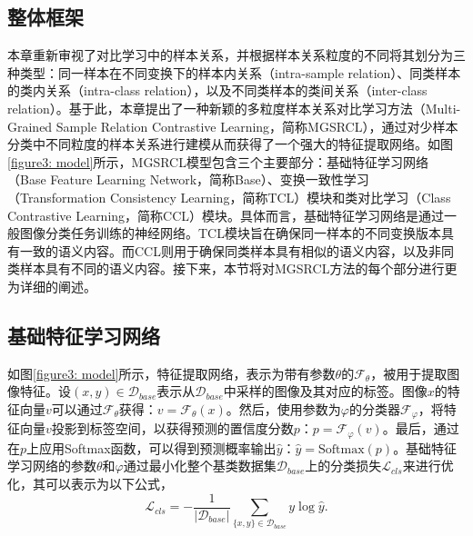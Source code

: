 \subsection[\hspace{-2pt}整体框架]{{\heiti{} \hspace{-8pt}整体框架}}\label{section3: 整体框架}

本章重新审视了对比学习中的样本关系，并根据样本关系粒度的不同将其划分为三种类型：同一样本在不同变换下的样本内关系（intra-sample relation）、同类样本的类内关系（intra-class relation），以及不同类样本的类间关系（inter-class relation）。基于此，本章提出了一种新颖的多粒度样本关系对比学习方法（Multi-Grained Sample Relation Contrastive Learning，简称MGSRCL），通过对少样本分类中不同粒度的样本关系进行建模从而获得了一个强大的特征提取网络。如图\ref{figure3: model}所示，MGSRCL模型包含三个主要部分：基础特征学习网络（Base Feature Learning Network，简称Base）、变换一致性学习（Transformation Consistency Learning，简称TCL）模块和类对比学习（Class Contrastive Learning，简称CCL）模块。具体而言，基础特征学习网络是通过一般图像分类任务训练的神经网络。TCL模块旨在确保同一样本的不同变换版本具有一致的语义内容。而CCL则用于确保同类样本具有相似的语义内容，以及非同类样本具有不同的语义内容。接下来，本节将对MGSRCL方法的每个部分进行更为详细的阐述。

\subsection[\hspace{-2pt}基础特征学习网络]{{\heiti{} \hspace{-8pt}基础特征学习网络}}\label{section3: 基础特征学习网络}

如图\ref{figure3: model}所示，特征提取网络，表示为带有参数$\theta$的$\mathcal{F}_{\theta}$，被用于提取图像特征。设$(x, y)\in \mathcal{D}_{base}$表示从$\mathcal{D}_{base}$中采样的图像及其对应的标签。图像$x$的特征向量$v$可以通过$\mathcal{F}_{\theta}$获得：$v=\mathcal{F}_{\theta}(x)$。然后，使用参数为$\varphi$的分类器$\mathcal{F}_{\varphi}$，将特征向量$v$投影到标签空间，以获得预测的置信度分数$p$：$p=\mathcal{F}_{\varphi}(v)$。最后，通过在$p$上应用Softmax函数，可以得到预测概率输出$\widehat{y}$：$\widehat{y}=\text{Softmax}(p)$。基础特征学习网络的参数$\theta$和$\varphi$通过最小化整个基类数据集$\mathcal{D}_{base}$上的分类损失$\mathcal{L}_{cls}$来进行优化，其可以表示为以下公式，
\begin{equation}
\label{equation3:3.2}
  \mathcal{L}_{cls} = - \frac{1}{|\mathcal{D}_{base}|}\sum_{\{x,y\}\in \mathcal{D}_{base}}y\log\widehat{y}.
\end{equation}

